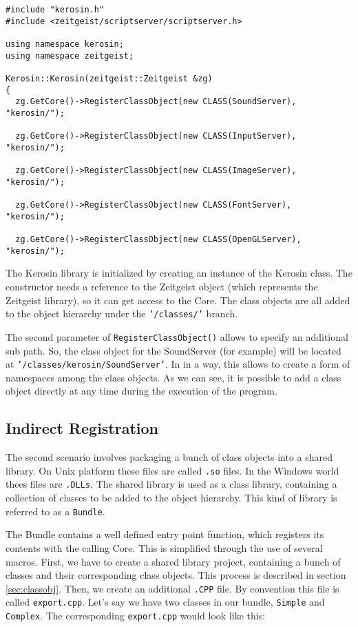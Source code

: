 \begin{verbatim}
#include "kerosin.h"
#include <zeitgeist/scriptserver/scriptserver.h>

using namespace kerosin;
using namespace zeitgeist;

Kerosin::Kerosin(zeitgeist::Zeitgeist &zg)
{
  zg.GetCore()->RegisterClassObject(new CLASS(SoundServer), "kerosin/");

  zg.GetCore()->RegisterClassObject(new CLASS(InputServer), "kerosin/");

  zg.GetCore()->RegisterClassObject(new CLASS(ImageServer), "kerosin/");

  zg.GetCore()->RegisterClassObject(new CLASS(FontServer), "kerosin/");

  zg.GetCore()->RegisterClassObject(new CLASS(OpenGLServer), "kerosin/");
\end{verbatim}

The Kerosin library is initialized by creating an instance of the
Kerosin class. The constructor needs a reference to the Zeitgeist
object (which represents the Zeitgeist library), so it can get access
to the Core. The class objects are all added to the object hierarchy
under the \texttt{'/classes/'} branch. 

The second parameter of \texttt{RegisterClassObject()} allows to
specify an additional sub path. So, the class object for the
SoundServer (for example) will be located at
\texttt{'/classes/kerosin/SoundServer'}. In in a way, this allows to create a
form of namespaces among the class objects. As we can see, it is
possible to add a class object directly at any time during the
execution of the program.

\subsection{Indirect Registration}

The second scenario involves packaging a bunch of class objects into a
shared library. On Unix platform these files are called \texttt{.so}
files. In the Windows world thees files are \texttt{.DLLs}. The shared
library is used as a class library, containing a collection of classes
to be added to the object hierarchy. This kind of library is referred
to as a \texttt{Bundle}. 

The Bundle contains a well defined entry point function, which
registers its contents with the calling Core. This is simplified
through the use of several macros. First, we have to create a shared
library project, containing a bunch of classes and their corresponding
class objects. This process is described in section
\ref{sec:classobj}. Then, we create an additional \texttt{.CPP} file. By convention
this file is called \texttt{export.cpp}. Let's say we have two classes
in our bundle, \texttt{Simple} and \texttt{Complex}. The corresponding
\texttt{export.cpp} would look like this:

